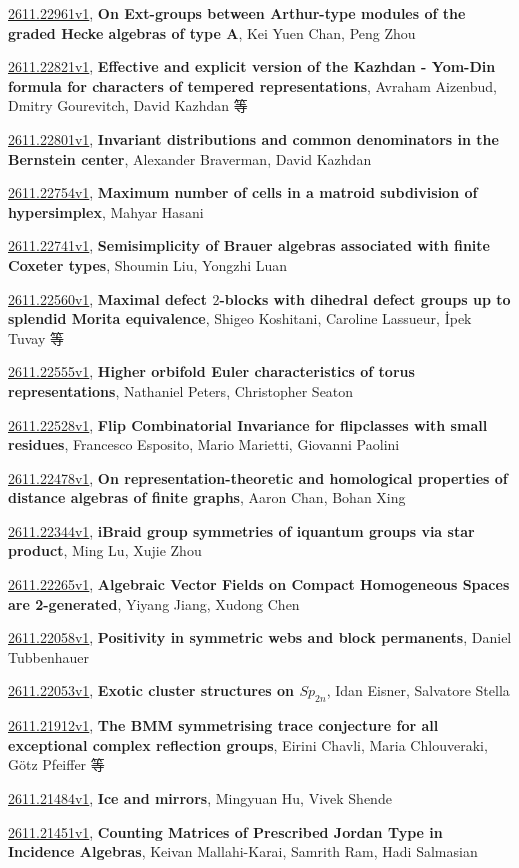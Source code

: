\documentclass[9pt, a4paper]{article}
\theoremstyle{plain}
\theoremstyle{definition}
\theoremstyle{remark}
\newcommand{\arxiv}[3]{\href{https://arxiv.org/abs/#1}{#1}, \textbf{\textcolor{arxivblue}{#2}}, #3}
\begin{document}
\arxiv{2611.22961v1}{On Ext-groups between Arthur-type modules of the graded Hecke algebras of type A}{Kei Yuen Chan, Peng Zhou}

\arxiv{2611.22821v1}{Effective and explicit version of the Kazhdan - Yom-Din formula for characters of tempered representations}{Avraham Aizenbud, Dmitry Gourevitch, David Kazhdan 等}

\arxiv{2611.22801v1}{Invariant distributions and common denominators in the Bernstein center}{Alexander Braverman, David Kazhdan}

\arxiv{2611.22754v1}{Maximum number of cells in a matroid subdivision of hypersimplex}{Mahyar Hasani}

\arxiv{2611.22741v1}{Semisimplicity of Brauer algebras associated with finite Coxeter types}{Shoumin Liu, Yongzhi Luan}

\arxiv{2611.22560v1}{Maximal defect $2$-blocks with dihedral defect groups up to splendid Morita equivalence}{Shigeo Koshitani, Caroline Lassueur, İpek Tuvay 等}

\arxiv{2611.22555v1}{Higher orbifold Euler characteristics of torus representations}{Nathaniel Peters, Christopher Seaton}

\arxiv{2611.22528v1}{Flip Combinatorial Invariance for flipclasses with small residues}{Francesco Esposito, Mario Marietti, Giovanni Paolini}

\arxiv{2611.22478v1}{On representation-theoretic and homological properties of distance algebras of finite graphs}{Aaron Chan, Bohan Xing}

\arxiv{2611.22344v1}{iBraid group symmetries of iquantum groups via star product}{Ming Lu, Xujie Zhou}

\arxiv{2611.22265v1}{Algebraic Vector Fields on Compact Homogeneous Spaces are 2-generated}{Yiyang Jiang, Xudong Chen}

\arxiv{2611.22058v1}{Positivity in symmetric webs and block permanents}{Daniel Tubbenhauer}

\arxiv{2611.22053v1}{Exotic cluster structures on $Sp_{2n}$}{Idan Eisner, Salvatore Stella}

\arxiv{2611.21912v1}{The BMM symmetrising trace conjecture for all exceptional complex reflection groups}{Eirini Chavli, Maria Chlouveraki, Götz Pfeiffer 等}

\arxiv{2611.21484v1}{Ice and mirrors}{Mingyuan Hu, Vivek Shende}

\arxiv{2611.21451v1}{Counting Matrices of Prescribed Jordan Type in Incidence Algebras}{Keivan Mallahi-Karai, Samrith Ram, Hadi Salmasian}
\end{document}
